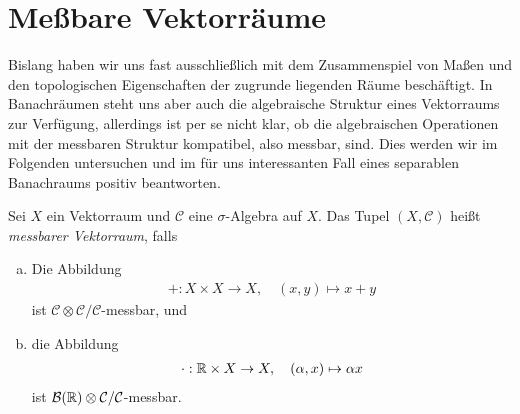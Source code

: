 \section{Meßbare Vektorräume}
Bislang haben wir uns fast ausschließlich mit dem Zusammenspiel von Maßen und den topologischen Eigenschaften der zugrunde liegenden Räume beschäftigt.
In Banachräumen steht uns aber auch die algebraische Struktur eines Vektorraums zur Verfügung, allerdings ist per se nicht klar, ob die algebraischen Operationen mit der messbaren Struktur kompatibel, also messbar, sind. 
Dies werden wir im Folgenden untersuchen und im für uns interessanten Fall eines separablen Banachraums positiv beantworten. 

\begin{mydef}
    Sei $X$ ein Vektorraum und $\mathcal{C}$ eine $\sigma$-Algebra auf $X$. Das Tupel $(X, \mathcal{C})$ heißt \textit{messbarer Vektorraum}, falls
    \begin{enumerate}[(a)]
        \item Die Abbildung 
        \begin{align*}
            + : X \times X \to X, \quad (x,y) \mapsto x + y
        \end{align*}
        ist $\mathcal{C}\otimes \mathcal{C}/\mathcal{C}$-messbar, und
        \item die Abbildung 
        \begin{align*}
            \cdot : \mathbb{R} \times X \to X, \quad  (\alpha, x) \mapsto \alpha x
        \end{align*}
        ist $\mathcal{B}(\mathbb{R}) \otimes \mathcal{C}/\mathcal{C}$-messbar. 
    \end{enumerate}
\end{mydef}


